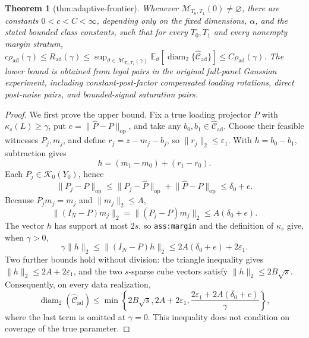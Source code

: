 \documentclass{article}
\newtheorem{theorem}{Theorem}
\begin{document}
\begin{theorem}[thm:adaptive-frontier]\label{thm:adaptive-frontier}
Whenever \(\mathcal M_{T_0,T_1}(0)\ne\varnothing\), there are constants \(0<c<C<\infty\), depending only on the fixed dimensions, \(\alpha\), and the stated bounded class constants, such that for every \(T_0,T_1\) and every nonempty margin stratum, \(c\rho_{\mathrm{ad}}(\gamma)\le R_{\mathrm{ad}}(\gamma)\le\sup_{\vartheta\in\mathcal M_{T_0,T_1}(\gamma)}\mathbb E_\vartheta[\operatorname{diam}_2\{\widehat{\mathcal C}_{\mathrm{ad}}\}]\le C\rho_{\mathrm{ad}}(\gamma)\). The lower bound is obtained from legal pairs in the original full-panel Gaussian experiment, including constant-post-factor compensated loading rotations, direct post-noise pairs, and bounded-signal saturation pairs.
\end{theorem}
\begin{proof}
We first prove the upper bound.  Fix a true loading projector \(P\) with \(\kappa_s(L)\ge\gamma\), put \(e=\lVert\widehat P-P\rVert_{\mathrm{op}}\), and take any \(b_0,b_1\in\widehat{\mathcal C}_{\mathrm{ad}}\).  Choose their feasible witnesses \(P_j,m_j\), and define \(r_j=z-m_j-b_j\), so \(\lVert r_j\rVert_2\le\varepsilon_1\).  With \(h=b_0-b_1\), subtraction gives
\[
 h=(m_1-m_0)+(r_1-r_0).
\]
Each \(P_j\in\mathcal K_0(Y_0)\), hence
\[
 \lVert P_j-P\rVert_{\mathrm{op}}
 \le\lVert P_j-\widehat P\rVert_{\mathrm{op}}
     +\lVert\widehat P-P\rVert_{\mathrm{op}}
 \le\delta_0+e.
\]
Because \(P_jm_j=m_j\) and \(\lVert m_j\rVert_2\le A\),
\[
 \lVert(I_N-P)m_j\rVert_2
 =\lVert(P_j-P)m_j\rVert_2
 \le A(\delta_0+e).
\]
The vector \(h\) has support at most \(2s\), so \texttt{ass:margin} and the definition of \(\kappa_s\) give, when \(\gamma>0\),
\[
 \gamma\lVert h\rVert_2
 \le\lVert(I_N-P)h\rVert_2
 \le2A(\delta_0+e)+2\varepsilon_1.
\]
Two further bounds hold without division: the triangle inequality gives \(\lVert h\rVert_2\le2A+2\varepsilon_1\), and the two \(s\)-sparse cube vectors satisfy \(\lVert h\rVert_2\le2B\sqrt s\).  Consequently, on every data realization,
\[
 \operatorname{diam}_2(\widehat{\mathcal C}_{\mathrm{ad}})
 \le\min\left\{2B\sqrt s, 2A+2\varepsilon_1,
 \frac{2\varepsilon_1+2A(\delta_0+e)}{\gamma}\right\},
\]
where the last term is omitted at \(\gamma=0\).  This inequality does not condition on coverage of the true parameter.


\end{proof}
\end{document}
